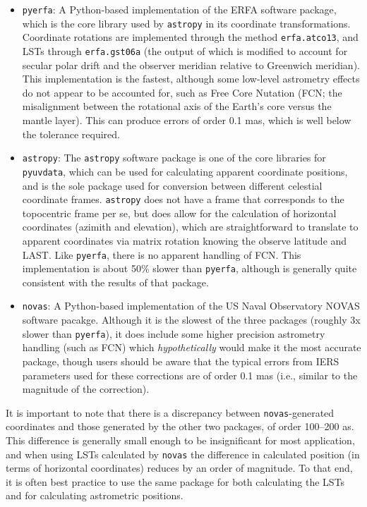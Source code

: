 \documentclass[11pt, oneside]{article}
\begin{document}
\begin{itemize}
\item{\texttt{pyerfa}}: A Python-based implementation of the ERFA software package, which is the core library used by \texttt{astropy} in its coordinate transformations. Coordinate rotations are implemented through the method \texttt{erfa.atco13}, and LSTs through \texttt{erfa.gst06a} (the output of which is modified to account for secular polar drift and the observer meridian relative to Greenwich meridian). This implementation is the fastest, although some low-level astrometry effects do not appear to be accounted for, such as Free Core Nutation (FCN; the misalignment between the rotational axis of the Earth's core versus the mantle layer). This can produce errors of order 0.1 mas, which is well below the tolerance required.

\item{\texttt{astropy}}: The \texttt{astropy} software package is one of the core libraries for \texttt{pyuvdata}, which can be used for calculating apparent coordinate positions, and is the sole package used for conversion between different celestial coordinate frames. \texttt{astropy} does not have a frame that corresponds to the topocentric frame per se, but does allow for the calculation of horizontal coordinates (azimith and elevation), which are straightforward to translate to apparent coordinates via matrix rotation knowing the observe latitude and LAST. Like \texttt{pyerfa}, there is no apparent handling of FCN. This implementation is about 50\% slower than \texttt{pyerfa}, although is generally quite consistent with the results of that package.

\item{\texttt{novas}}: A Python-based implementation of the US Naval Observatory NOVAS software pacakge. Although it is the slowest of the three packages (roughly 3x slower than \texttt{pyerfa}), it does include some higher precision astrometry handling (such as FCN) which \textit{hypothetically} would make it the most accurate package, though users should be aware that the typical errors from IERS parameters used for these corrections are of order 0.1 mas (i.e., similar to the magnitude of the correction).
\end{itemize}

It is important to note that there is a discrepancy between \texttt{novas}-generated coordinates and those generated by the other two packages, of order 100--200 {\textmu}as. This difference is generally small enough to be insignificant for most application, and when using LSTs calculated by \texttt{novas} the difference in calculated position (in terms of horizontal coordinates) reduces by an order of magnitude. To that end, it is often best practice to use the same package for both calculating the LSTs and for calculating astrometric positions.
\end{document}
